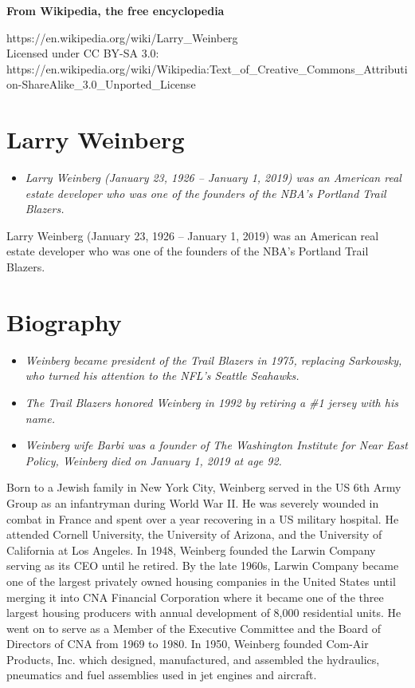 \textbf{From Wikipedia, the free encyclopedia}

https://en.wikipedia.org/wiki/Larry\_Weinberg\\
Licensed under CC BY-SA 3.0:\\
https://en.wikipedia.org/wiki/Wikipedia:Text\_of\_Creative\_Commons\_Attribution-ShareAlike\_3.0\_Unported\_License

\section{Larry Weinberg}\label{larry-weinberg}

\begin{itemize}
\item
  \emph{Larry Weinberg (January 23, 1926 -- January 1, 2019) was an
  American real estate developer who was one of the founders of the
  NBA's Portland Trail Blazers.}
\end{itemize}

Larry Weinberg (January 23, 1926 -- January 1, 2019) was an American
real estate developer who was one of the founders of the NBA's Portland
Trail Blazers.

\section{Biography}\label{biography}

\begin{itemize}
\item
  \emph{Weinberg became president of the Trail Blazers in 1975,
  replacing Sarkowsky, who turned his attention to the NFL's Seattle
  Seahawks.}
\item
  \emph{The Trail Blazers honored Weinberg in 1992 by retiring a \#1
  jersey with his name.}
\item
  \emph{Weinberg wife Barbi was a founder of The Washington Institute
  for Near East Policy, Weinberg died on January 1, 2019 at age 92.}
\end{itemize}

Born to a Jewish family in New York City, Weinberg served in the US 6th
Army Group as an infantryman during World War II. He was severely
wounded in combat in France and spent over a year recovering in a US
military hospital. He attended Cornell University, the University of
Arizona, and the University of California at Los Angeles. In 1948,
Weinberg founded the Larwin Company serving as its CEO until he retired.
By the late 1960s, Larwin Company became one of the largest privately
owned housing companies in the United States until merging it into CNA
Financial Corporation where it became one of the three largest housing
producers with annual development of 8,000 residential units. He went on
to serve as a Member of the Executive Committee and the Board of
Directors of CNA from 1969 to 1980. In 1950, Weinberg founded Com-Air
Products, Inc. which designed, manufactured, and assembled the
hydraulics, pneumatics and fuel assemblies used in jet engines and
aircraft.

